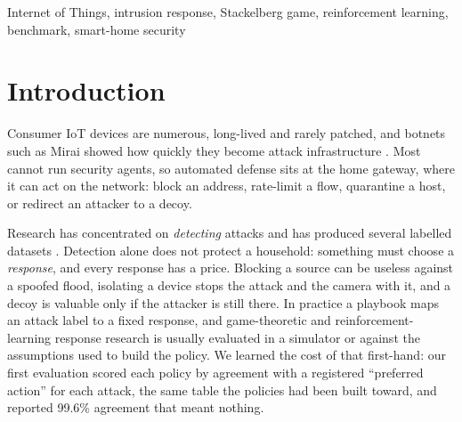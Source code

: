 \documentclass[conference]{IEEEtran}
\begin{document}
\begin{IEEEkeywords}
Internet of Things, intrusion response, Stackelberg game, reinforcement learning, benchmark, smart-home security
\end{IEEEkeywords}

\section{Introduction}
\label{sec:intro}
Consumer IoT devices are numerous, long-lived and rarely patched, and botnets such as Mirai showed how quickly they become attack infrastructure \cite{antonakakis2017mirai}. Most cannot run security agents, so automated defense sits at the home gateway, where it can act on the network: block an address, rate-limit a flow, quarantine a host, or redirect an attacker to a decoy.

Research has concentrated on \emph{detecting} attacks and has produced several labelled datasets \cite{garcia2020iot23,meidan2018nbaiot,koroniotis2019botiot,neto2023ciciot}. Detection alone does not protect a household: something must choose a \emph{response}, and every response has a price. Blocking a source can be useless against a spoofed flood, isolating a device stops the attack and the camera with it, and a decoy is valuable only if the attacker is still there. In practice a playbook maps an attack label to a fixed response, and game-theoretic \cite{manshaei2013game,tambe2011security,alpcan2010network} and reinforcement-learning \cite{nguyen2021deep,standen2021cyborg} response research is usually evaluated in a simulator or against the assumptions used to build the policy. We learned the cost of that first-hand: our first evaluation scored each policy by agreement with a registered ``preferred action'' for each attack, the same table the policies had been built toward, and reported 99.6\% agreement that meant nothing.
\end{document}
